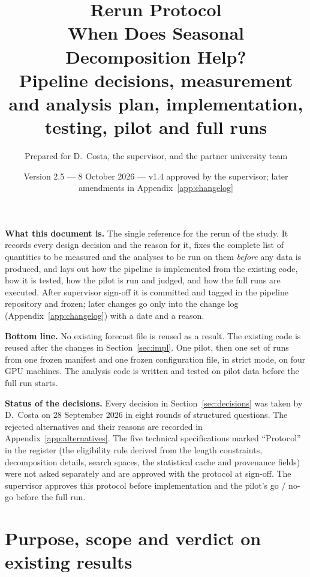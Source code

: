 \documentclass[11pt,a4paper]{article}
\title{\color{accent}\textbf{Rerun Protocol}\\[4pt]
\large When Does Seasonal Decomposition Help?\\
Pipeline decisions, measurement and analysis plan, implementation,\\ testing, pilot and full runs}
\author{Prepared for D.\ Costa, the supervisor, and the partner university team}
\date{Version 2.5 --- 8 October 2026 --- v1.4 approved by the supervisor; later amendments in Appendix~\ref{app:changelog}}
\newenvironment{keybox}%
  {\par\medskip\noindent\begin{lrbox}{\notebox}\begin{minipage}{\dimexpr\linewidth-2\fboxsep-2\fboxrule\relax}}%
  {\end{minipage}\end{lrbox}\fcolorbox{accent}{soft}{\usebox{\notebox}}\par\medskip}
\newenvironment{decisionbox}%
  {\par\medskip\noindent\begin{lrbox}{\notebox}\begin{minipage}{\dimexpr\linewidth-2\fboxsep-2\fboxrule\relax}}%
  {\end{minipage}\end{lrbox}\fcolorbox{warnline}{warnsoft}{\usebox{\notebox}}\par\medskip}
\begin{document}
\maketitle
\thispagestyle{fancy}

\begin{keybox}
\textbf{What this document is.} The single reference for the rerun of the study. It records every
design decision and the reason for it, fixes the complete list of quantities to be measured and the
analyses to be run on them \emph{before} any data is produced, and lays out how the pipeline is
implemented from the existing code, how it is tested, how the pilot is run and judged, and how the
full runs are executed. After supervisor sign-off it is committed and tagged in the pipeline
repository and frozen; later changes go only into the change log (Appendix~\ref{app:changelog})
with a date and a reason.

\smallskip
\textbf{Bottom line.} No existing forecast file is reused as a result. The existing code is reused
after the changes in Section~\ref{sec:impl}. One pilot, then one set of runs from one frozen
manifest and one frozen configuration file, in strict mode, on four GPU machines. The analysis code
is written and tested on pilot data before the full run starts.
\end{keybox}

\begin{decisionbox}
\textbf{Status of the decisions.} Every decision in Section~\ref{sec:decisions} was taken by
D.\ Costa on 28 September 2026 in eight rounds of structured questions. The rejected alternatives
and their reasons are recorded in Appendix~\ref{app:alternatives}. The five technical
specifications marked ``Protocol'' in the register (the eligibility rule derived from the length
constraints, decomposition details, search spaces, the statistical cache and provenance fields)
were not asked separately and are approved with the protocol at sign-off. The supervisor approves this protocol before implementation and the pilot's
go / no-go before the full run.
\end{decisionbox}

\tableofcontents
\newpage

\section{Purpose, scope and verdict on existing results}\label{sec:purpose}
\end{document}
